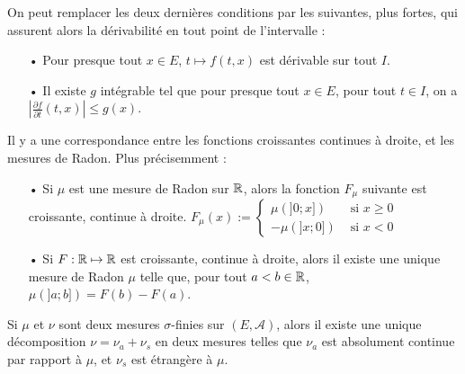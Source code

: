 \documentclass[11pt,a4paper]{article}
\begin{document}
\begin{rmq}
On peut remplacer les deux dernières conditions par les suivantes, plus fortes, qui assurent alors la dérivabilité en tout point de l'intervalle :
\begin{itemize}
\item[•] Pour presque tout $x \in E$, $t\mapsto f(t,x)$ est dérivable sur tout $I$.
\item[•] Il existe $g$ intégrable tel que pour presque tout $x\in E$, pour tout $t\in I$, on a $\displaystyle \left| \frac{\partial f}{\partial t}(t,x) \right| \leq g(x)$.
\end{itemize}
\end{rmq}


\begin{prop}
Il y a une correspondance entre les fonctions croissantes continues à droite, et les mesures de Radon. Plus précisemment :
\begin{itemize}
\item[•] Si $\mu$ est une mesure de Radon sur $\mathbb R$, alors la fonction $F_{\mu}$ suivante est croissante, continue à droite.
$\displaystyle F_{\mu}(x) := \begin{cases} \mu(]0;x]) & \text{ si } x \geq 0  \\ -\mu(]x;0]) & \text{ si } x < 0 \end{cases}$
\item[•] Si $F : \mathbb R \mapsto \mathbb R$ est croissante, continue à droite, alors il existe une unique mesure de Radon $\mu$ telle que, pour tout $a<b \in \mathbb R$, $\mu(]a;b])=F(b)-F(a)$.
\end{itemize}
\end{prop}

\begin{cor}
Si $\mu$ et $\nu$ sont deux mesures $\sigma$-finies sur $(E,\mathcal{A})$, alors il existe une unique décomposition $\nu = \nu_a + \nu_s$ en deux mesures telles que $\nu_a$ est absolument continue par rapport à $\mu$, et $\nu_s$ est étrangère à $\mu$. 

\end{cor}
\end{document}
